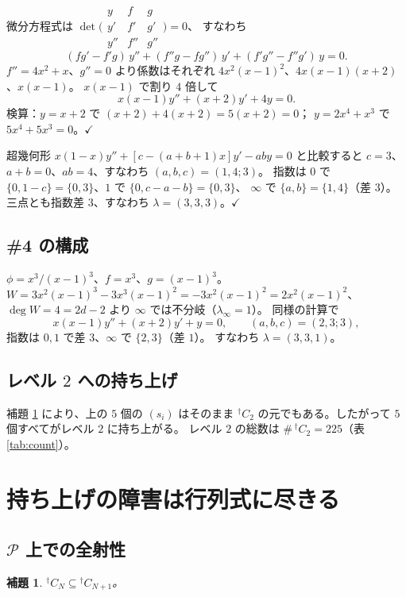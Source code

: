 \documentclass[a4paper,11pt]{ltjsarticle}
\theoremstyle{plain}
\newtheorem{lemma}[theorem]{補題}
\theoremstyle{definition}
\newcommand{\sP}{\mathscr{P}}
\begin{document}
微分方程式は
$\det\bigl(\begin{smallmatrix}y&f&g\\ y'&f'&g'\\ y''&f''&g''\end{smallmatrix}\bigr)=0$、
すなわち
\[
  (fg'-f'g)\,y''+(f''g-fg'')\,y'+(f'g''-f''g')\,y=0 .
\]
$f''=4x^2+x$、$g''=0$ より係数はそれぞれ
$4x^2(x-1)^2$、$4x(x-1)(x+2)$、$x(x-1)$。
$x(x-1)$ で割り $4$ 倍して
\[
  x(x-1)y''+(x+2)y'+4y=0 .
\]
検算：$y=x+2$ で $(x+2)+4(x+2)=5(x+2)=0$；
$y=2x^4+x^3$ で $5x^4+5x^3=0$。\quad$\checkmark$

超幾何形 $x(1-x)y''+[c-(a+b+1)x]y'-aby=0$ と比較すると
$c=3$、$a+b=0$、$ab=4$、すなわち $(a,b,c)=(1,4;3)$。
指数は $0$ で $\{0,1-c\}=\{0,3\}$、$1$ で $\{0,c-a-b\}=\{0,3\}$、
$\infty$ で $\{a,b\}=\{1,4\}$（差 $3$）。
三点とも指数差 $3$、すなわち $\lambda=(3,3,3)$。\quad$\checkmark$

\subsection{\#4 の構成}

$\phi=x^3/(x-1)^3$、$f=x^3$、$g=(x-1)^3$。
$W=3x^2(x-1)^3-3x^3(x-1)^2=-3x^2(x-1)^2=2x^2(x-1)^2$、
$\deg W=4=2d-2$ より $\infty$ では不分岐（$\lambda_\infty=1$）。
同様の計算で
\[
  x(x-1)y''+(x+2)y'+y=0,\qquad (a,b,c)=(2,3;3),
\]
指数は $0,1$ で差 $3$、$\infty$ で $\{2,3\}$（差 $1$）。
すなわち $\lambda=(3,3,1)$。

\subsection{レベル $2$ への持ち上げ}

補題 \ref{lem:nesting} により、上の $5$ 個の $(s_i)$ はそのまま
${}^{\dagger}C_2$ の元でもある。したがって $5$ 個すべてがレベル $2$ に持ち上がる。
レベル $2$ の総数は $\#\,{}^{\dagger}C_2=225$（表 \ref{tab:count}）。

\section{持ち上げの障害は行列式に尽きる}\label{sec:M03}

\subsection{$\sP$ 上での全射性}

\begin{lemma}\label{lem:nesting}
${}^{\dagger}C_N\subseteq{}^{\dagger}C_{N+1}$。
\end{lemma}
\end{document}
